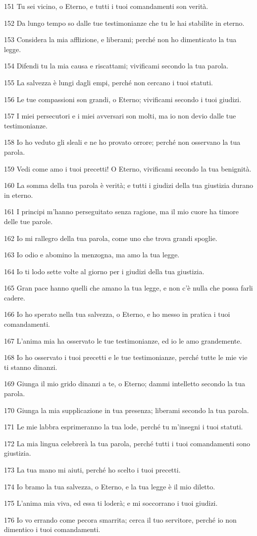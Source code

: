 \par 151 Tu sei vicino, o Eterno, e tutti i tuoi comandamenti son verità.
\par 152 Da lungo tempo so dalle tue testimonianze che tu le hai stabilite in eterno.
\par 153 Considera la mia afflizione, e liberami; perché non ho dimenticato la tua legge.
\par 154 Difendi tu la mia causa e riscattami; vivificami secondo la tua parola.
\par 155 La salvezza è lungi dagli empi, perché non cercano i tuoi statuti.
\par 156 Le tue compassioni son grandi, o Eterno; vivificami secondo i tuoi giudizi.
\par 157 I miei persecutori e i miei avversari son molti, ma io non devio dalle tue testimonianze.
\par 158 Io ho veduto gli sleali e ne ho provato orrore; perché non osservano la tua parola.
\par 159 Vedi come amo i tuoi precetti! O Eterno, vivificami secondo la tua benignità.
\par 160 La somma della tua parola è verità; e tutti i giudizi della tua giustizia durano in eterno.
\par 161 I principi m'hanno perseguitato senza ragione, ma il mio cuore ha timore delle tue parole.
\par 162 Io mi rallegro della tua parola, come uno che trova grandi spoglie.
\par 163 Io odio e abomino la menzogna, ma amo la tua legge.
\par 164 Io ti lodo sette volte al giorno per i giudizi della tua giustizia.
\par 165 Gran pace hanno quelli che amano la tua legge, e non c'è nulla che possa farli cadere.
\par 166 Io ho sperato nella tua salvezza, o Eterno, e ho messo in pratica i tuoi comandamenti.
\par 167 L'anima mia ha osservato le tue testimonianze, ed io le amo grandemente.
\par 168 Io ho osservato i tuoi precetti e le tue testimonianze, perché tutte le mie vie ti stanno dinanzi.
\par 169 Giunga il mio grido dinanzi a te, o Eterno; dammi intelletto secondo la tua parola.
\par 170 Giunga la mia supplicazione in tua presenza; liberami secondo la tua parola.
\par 171 Le mie labbra esprimeranno la tua lode, perché tu m'insegni i tuoi statuti.
\par 172 La mia lingua celebrerà la tua parola, perché tutti i tuoi comandamenti sono giustizia.
\par 173 La tua mano mi aiuti, perché ho scelto i tuoi precetti.
\par 174 Io bramo la tua salvezza, o Eterno, e la tua legge è il mio diletto.
\par 175 L'anima mia viva, ed essa ti loderà; e mi soccorrano i tuoi giudizi.
\par 176 Io vo errando come pecora smarrita; cerca il tuo servitore, perché io non dimentico i tuoi comandamenti.

